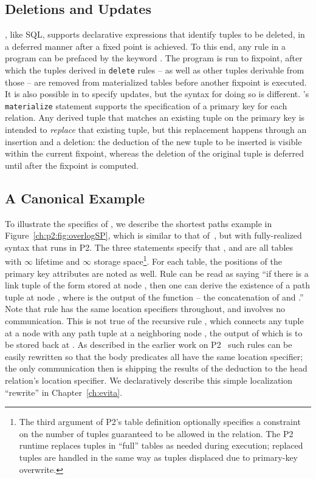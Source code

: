 \subsection{Deletions and Updates}

\OVERLOG, like SQL, supports declarative expressions that identify tuples to be
deleted, in a deferred manner after a fixed point is achieved. To this end, any
\OVERLOG rule in a program can be prefaced by the keyword .  The
program is run to fixpoint, after which the tuples derived in {\tt delete}
rules -- as well as other tuples derivable from those -- are removed from
materialized tables before another fixpoint is executed.  It is also possible
in \OVERLOG to specify updates, but the syntax for doing so is different.
\OVERLOG's {\tt materialize} statement supports the specification of a primary
key for each relation.  Any derived tuple that matches an existing tuple on the
primary key is intended to {\em replace} that existing tuple, but this
replacement happens through an insertion and a deletion: the deduction of the
new tuple to be inserted is visible within the current fixpoint, whereas the
deletion of the original tuple is deferred until after the fixpoint is computed.

\subsection{A Canonical Example}
\label{ch:p2:sec:declnet}

To illustrate the specifics of \OVERLOG, we describe the shortest paths example
in Figure~\ref{ch:p2:fig:overlogSP}, which is similar to that
of~\cite{loo-sigmod06}, but with fully-realized \OVERLOG syntax that runs in
P2.  The three  statements specify that , 
and  are all tables with $\infty$ lifetime and $\infty$ storage
space\footnote{The third argument of P2's table definition optionally specifies
a constraint on the number of tuples guaranteed to be allowed in the relation.
The P2 runtime replaces tuples in ``full'' tables as needed during execution;
replaced tuples are handled in the same way as tuples displaced due to
primary-key overwrite.}.  For each table, the positions of the primary key
attributes are noted as well.  Rule  can be read as saying ``if there is
a link tuple of the form  stored at node , then one can
derive the existence of a path tuple  at node , where
 is the output of the function  -- the concatenation of
 and .'' Note that rule  has the same location specifiers
throughout, and involves no communication.  This is not true of the recursive
rule , which connects any  tuple at a node  with any path
tuple at a neighboring node , the output of which is to be stored back at
.  As described in the earlier work on
P2~\cite{loo-sigcomm05,loo-sigmod06} such rules can be easily rewritten so that
the body predicates all have the same location specifier; the only
communication then is shipping the results of the deduction to the head
relation's location specifier.  We declaratively describe this simple 
localization ``rewrite'' in Chapter~\ref{ch:evita}.

